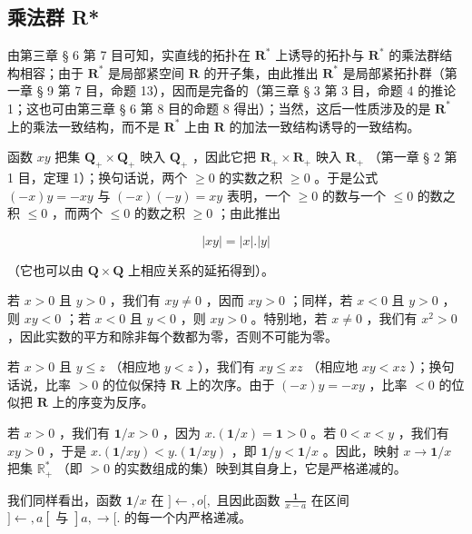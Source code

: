 \subsection{乘法群 R*}

由第三章 § 6 第 7 目可知，实直线的拓扑在 \(\mathbf{R}^*\) 上诱导的拓扑与 \(\mathbf{R}^*\) 的乘法群结构相容；由于 \(\mathbf{R}^*\) 是局部紧空间 \(\mathbf{R}\) 的开子集，由此推出 \(\mathbf{R}^*\) 是局部紧拓扑群（第一章 § 9 第 7 目，命题 13），因而是完备的（第三章 § 3 第 3 目，命题 4 的推论 1；这也可由第三章 § 6 第 8 目的命题 8 得出）；当然，这后一性质涉及的是 \(\mathbf{R}^*\) 上的乘法一致结构，而不是 \(\mathbf{R}^*\) 上由 \(\mathbf{R}\) 的加法一致结构诱导的一致结构。

函数 \(xy\) 把集 \(\mathbf{Q}_{+} \times \mathbf{Q}_{+}\) 映入 \(\mathbf{Q}_{+}\) ，因此它把 \(\mathbf{R}_{+} \times \mathbf{R}_{+}\) 映入 \(\mathbf{R}_{+}\) （第一章 § 2 第 1 目，定理 1）；换句话说，两个 \(\geqslant 0\) 的实数之积 \(\geqslant 0\) 。于是公式 \((-x)y = -xy\) 与 \((-x)(-y) = xy\) 表明，一个 \(\geqslant 0\) 的数与一个 \(\leqslant 0\) 的数之积 \(\leqslant 0\) ，而两个 \(\leqslant 0\) 的数之积 \(\geqslant 0\) ；由此推出

\[
| x y | = | x |. | y |\tag{1}
\]

（它也可以由 \(\mathbf{Q} \times \mathbf{Q}\) 上相应关系的延拓得到）。

若 \(x > 0\) 且 \(y > 0\) ，我们有 \(xy \neq 0\) ，因而 \(xy > 0\) ；同样，若 \(x < 0\) 且 \(y > 0\) ，则 \(xy < 0\) ；若 \(x < 0\) 且 \(y < 0\) ，则 \(xy > 0\) 。特别地，若 \(x \neq 0\) ，我们有 \(x^2 > 0\) ，因此实数的平方和除非每个数都为零，否则不可能为零。

若 \(x > 0\) 且 \(y \leqslant z\) （相应地 \(y < z\) ），我们有 \(xy \leqslant xz\) （相应地 \(xy < xz\) ）；换句话说，比率 \(> 0\) 的位似保持 \(\mathbf{R}\) 上的次序。由于 \((-x)y = -xy\) ，比率 \(< 0\) 的位似把 \(\mathbf{R}\) 上的序变为反序。

若 \(x > 0\) ，我们有 \(\mathbf{1} / x > 0\) ，因为 \(x.(\mathbf{1} / x) = \mathbf{1} > 0\) 。若 \(0 < x < y\) ，我们有 \(xy > 0\) ，于是 \(x.(\mathbf{1} / xy) < y.(\mathbf{1} / xy)\) ，即 \(\mathbf{1} / y < \mathbf{1} / x\) 。因此，映射 \(x \to \mathbf{1} / x\) 把集 \(\mathbb{R}_+^*\) （即 \(> 0\) 的实数组成的集）映到其自身上，它是严格递减的。

我们同样看出，函数 \(\mathbf{1} / x\) 在 \(] \leftarrow, o[, \text{ 且因此函数 } \frac{\mathbf{1}}{x - a}\) 在区间 \(] \leftarrow, a[ \text{ 与 } ]a, \rightarrow [.\) 的每一个内严格递减。

